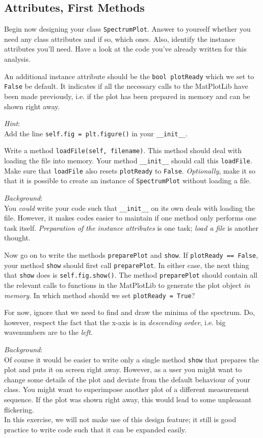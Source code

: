 \documentclass[
	english,
	fontsize=10pt,
	parskip=half,
	titlepage=true,
	DIV=12
]{scrartcl}
\newcommand*{\inPy}[1]{\texttt{#1}}
\newcommand*{\ie}{i.\;e. }
\begin{document}
\subsection{Attributes, First Methods}
Begin now designing your class \texttt{SpectrumPlot}. Answer to yourself whether you need any class attributes and if so, which ones. Also, identify the instance attributes you'll need. Have a look at the code you've already written for this analysis.

An additional instance attribute should be the \texttt{bool plotReady} which we set to \inPy{False} be default. It indicates if all the necessary calls to the MatPlotLib have been made previously, \ie if the plot has been prepared in memory and can be shown right away.

\emph{Hint}:\\
Add the line \inPy{self.fig = plt.figure()} in your \inPy{__init__}.

Write a method \inPy{loadFile(self, filename)}. This method should deal with loading the file into memory. Your method \inPy{__init__} should call this \texttt{loadFile}. Make sure that \texttt{loadFile} also resets \texttt{plotReady} to \inPy{False}. \emph{Optionally}, make it so that it is possible to create an instance of \texttt{SpectrumPlot} without loading a file.

\emph{Background}:\\
You \emph{could} write your code such that \inPy{__init__} on its own deals with loading the file. However, it makes codes easier to maintain if one method only performs one task itself. \emph{Preparation of the instance attributes} is one task; \emph{load a file} is another thought.

Now go on to write the methods \texttt{preparePlot} and \texttt{show}. If \texttt{plotReady == False}, your method \texttt{show} should first call \texttt{preparePlot}. In either case, the next thing that \texttt{show} does is \texttt{self.fig.show()}. The method \texttt{preparePlot} should contain all the relevant calls to functions in the MatPlotLib to generate the plot object \emph{in memory}. In which method should we set \inPy{plotReady = True}?

For now, ignore that we need to find and draw the minima of the spectrum. Do, however, respect the fact that the x-axis is in \emph{descending order}, \ie big wavenumbers are to the \emph{left}.

\emph{Background}:\\
Of course it would be easier to write only a single method \texttt{show} that prepares the plot and puts it on screen right away. However, as a user you might want to change some details of the plot and deviate from the default behaviour of your class. You might want to superimpose another plot of a different measurement sequence. If the plot was shown right away, this would lead to some unpleasant flickering.\\
In this exercise, we will not make use of this design feature; it still is good practice to write code such that it can be expanded easily.
\end{document}
